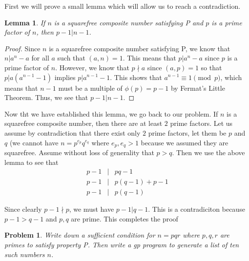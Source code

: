 \documentclass[psamsfonts]{amsart}
\newtheorem{prob}{Problem}[section]
\newtheorem{lem}[thm]{Lemma}
\newenvironment{sol}{{\bfseries Solution}}{\qedsymbol}
\theoremstyle{definition}
\theoremstyle{remark}
\numberwithin{equation}{section}
\begin{document}
\begin{sol}
First we will prove a small lemma which will allow us to reach a contradiction.

\begin{lem}
If $n$ is a squarefree composite number satisfying P and $p$ is a prime factor of $n$, then $p-1 | n - 1$. 
\end{lem}

\begin{proof}
Since $n$ is a squarefree composite number satisfying P, we know that $n | a^n - a$ for all $a$ such that $(a,n) = 1$. This means that $p | a^n - a$ since $p$ is a prime factor of $n$. However, we know that $p \nmid a$ since $(a,p) = 1$ so that $p | a (a^{n-1} - 1)$ implies $p | a^{n-1} - 1$. This shows that $a^{n-1} \equiv 1 \pmod{p}$, which means that $n-1$ must be a multiple of $\phi(p) = p - 1$ by Fermat's Little Theorem. Thus, we see that $p - 1 | n - 1$. 
\end{proof}

Now tht we have established this lemma, we go back to our problem. If $n$ is a squarefree composite number, then there are at least $2$ prime factors. Let us assume by contradiction that there exist only $2$ prime factors, let them be $p$ and $q$ (we cannot have $n = p^{e_p} q^{e_q}$ where $e_p, e_q > 1$ because we assumed they are squarefree. Assume without loss of generality that $p > q$. Then we use the above lemma to see that
\begin{eqnarray}
p - 1 &|& pq - 1 \\
p - 1 &|& p(q-1) + p - 1 \\
p - 1 &|& p(q-1) 
\end{eqnarray}

Since clearly $p-1 \nmid p$, we must have $p-1 | q-1$. This is a contradiciton because $p - 1 > q - 1$ and $p,q$ are prime. This completes the proof 
\end{sol}

\begin{prob}
Write down a sufficient condition for $n = pqr$ where $p,q,r$ are primes to satisfy property P. Then write a gp program to generate a list of ten such numbers $n$. 
\end{prob}
\end{document}
